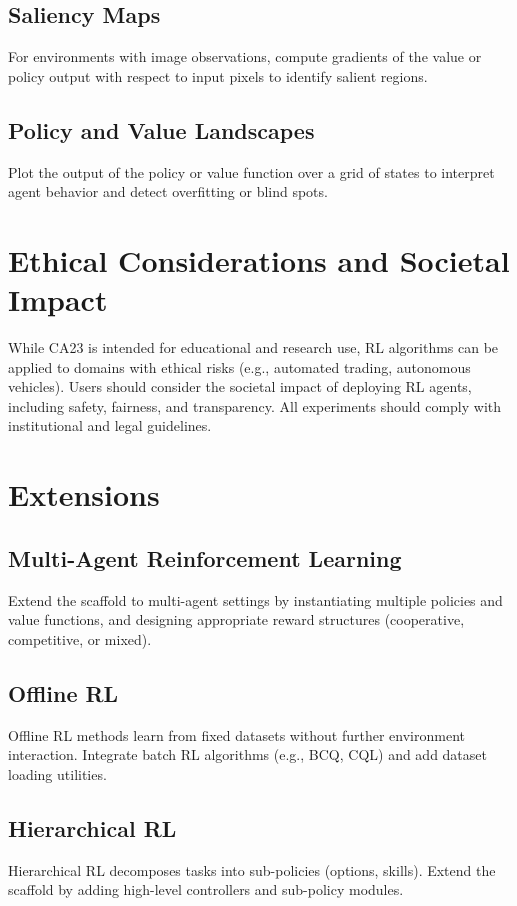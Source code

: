 \documentclass[11pt]{article}
\begin{document}
\subsection{Saliency Maps}
For environments with image observations, compute gradients of the value or policy output with respect to input pixels to identify salient regions.

\subsection{Policy and Value Landscapes}
Plot the output of the policy or value function over a grid of states to interpret agent behavior and detect overfitting or blind spots.

\section{Ethical Considerations and Societal Impact}
While CA23 is intended for educational and research use, RL algorithms can be applied to domains with ethical risks (e.g., automated trading, autonomous vehicles). Users should consider the societal impact of deploying RL agents, including safety, fairness, and transparency. All experiments should comply with institutional and legal guidelines.

\section{Extensions}
\subsection{Multi-Agent Reinforcement Learning}
Extend the scaffold to multi-agent settings by instantiating multiple policies and value functions, and designing appropriate reward structures (cooperative, competitive, or mixed).

\subsection{Offline RL}
Offline RL methods learn from fixed datasets without further environment interaction. Integrate batch RL algorithms (e.g., BCQ, CQL) and add dataset loading utilities.

\subsection{Hierarchical RL}
Hierarchical RL decomposes tasks into sub-policies (options, skills). Extend the scaffold by adding high-level controllers and sub-policy modules.
\end{document}
